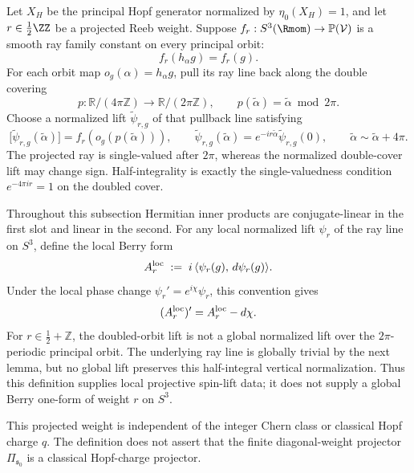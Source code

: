 \documentclass[11pt,a4paper]{article}
\begin{document}
\begin{definition}
\label{p2:def:berry-connection}
Let \(X_H\) be the principal Hopf generator normalized by
\(\eta_0(X_H)=1\), and let \(r\in\frac12\ZZ\) be a projected Reeb weight.
Suppose \(f_r:S^3(\Rmom)\to\mathbb P(\mathcal V)\) is a smooth ray family
constant on every principal orbit:
\[
        f_r(h_\alpha g)=f_r(g).
\]
For each orbit map \(o_g(\alpha)=h_\alpha g\), pull its ray line back along
the double covering
\[
 p:\mathbb R/(4\pi\mathbb Z)\longrightarrow
   \mathbb R/(2\pi\mathbb Z),
 \qquad
 p(\widetilde\alpha)=\widetilde\alpha\bmod2\pi.
\]
Choose a normalized lift
\(\widetilde\psi_{r,g}\) of that pullback line satisfying
\begin{equation}
\label{p2:eq:psi-q0}
\bigl[\widetilde\psi_{r,g}(\widetilde\alpha)\bigr]
=f_r(o_g(p(\widetilde\alpha))),
\qquad
\widetilde\psi_{r,g}(\widetilde\alpha)
=e^{-ir\widetilde\alpha}\widetilde\psi_{r,g}(0),
\qquad
\widetilde\alpha\sim\widetilde\alpha+4\pi .
\end{equation}
The projected ray is single-valued after \(2\pi\), whereas the normalized
double-cover lift may change sign.  Half-integrality is exactly the
single-valuedness condition \(e^{-4\pi i r}=1\) on the doubled cover.

Throughout this subsection Hermitian inner products are conjugate-linear in
the first slot and linear in the second.  For any local normalized lift
\(\psi_r\) of the ray line on \(S^3\), define the local Berry form
\begin{equation}
\label{p2:eq:berry-A}
A_r^{\rm loc}
\;:=\;
i\,\langle \psi_r(g),\,d\psi_r(g)\rangle.
\end{equation}
Under the local phase change
\(\psi_r'=e^{i\chi}\psi_r\), this convention gives
\[
        (A_r^{\rm loc})'=A_r^{\rm loc}-d\chi.
\]
For \(r\in\frac12+\mathbb Z\), the doubled-orbit lift is not a global
normalized lift over the \(2\pi\)-periodic principal orbit.  The underlying
ray line is globally trivial by the next lemma, but no global lift preserves
this half-integral vertical normalization.  Thus this definition supplies
local projective spin-lift data; it does not supply a global Berry one-form of
weight \(r\) on \(S^3\).

This projected weight is independent of the integer Chern class or classical
Hopf charge \(q\).  The definition does not assert that the finite
diagonal-weight projector \(\Pi_{\mathfrak s_0}\) is a classical Hopf-charge
projector.
\end{definition}
\end{document}
